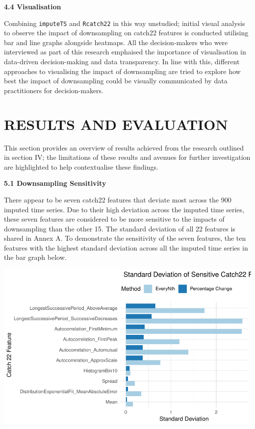 \documentclass{article}
\begin{document}
\textbf{4.4 Visualisation}

Combining \texttt{imputeTS} and \texttt{Rcatch22} in this way unstudied;
initial visual analysis to observe the impact of downsampling on catch22
features is conducted utilising bar and line graphs alongside heatmaps.
All the decision-makers who were interviewed as part of this research
emphaised the importance of visualisation in data-driven decision-making
and data transparency. In line with this, different approaches to
visualising the impact of downsampling are tried to explore how best the
impact of downsampling could be visually communicated by data
practitioners for decision-makers.

\hypertarget{results-and-evaluation}{%
\section{RESULTS AND EVALUATION}\label{results-and-evaluation}}

\label{sec:headings}

This section provides an overview of results achieved from the research
outlined in section IV; the limitations of these results and avenues for
further investigation are highlighted to help contextualise these
findings.

\textbf{5.1 Downsampling Sensitivity}

There appear to be seven catch22 features that deviate most across the
900 imputed time series. Due to their high deviation across the imputed
time series, these seven features are considered to be more sensitive to
the impacts of downsampling than the other 15. The standard deviation of
all 22 features is shared in Annex A. To demonstrate the sensitivity of
the seven features, the ten features with the highest standard deviation
across all the imputed time series in the bar graph below.

\includegraphics{210431461_CSC8639_Dissertation_files/figure-latex/CombinedSensitivity-1.pdf}
\end{document}
